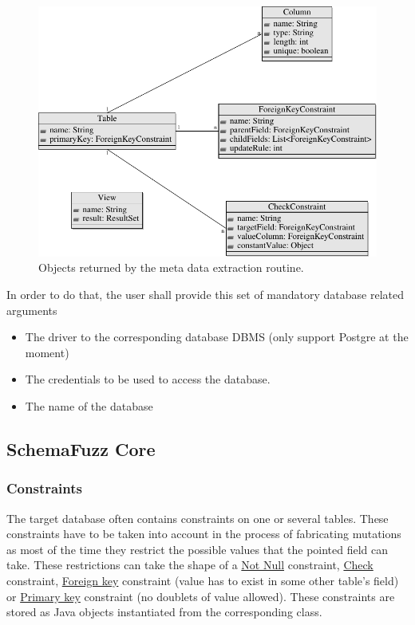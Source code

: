 \documentclass{article}
\begin{document}
\begin{empfile}
\begin{figure} [h!]
\centering
\includegraphics[width=\textwidth]{MetaDataExtractionDiagram-1.pdf}
\caption{Objects returned by the meta data extraction routine.}
\end{figure}

In order to do that, the user shall provide this set of mandatory database related arguments
			\begin{itemize}
 				\item The driver to the corresponding database DBMS (only support Postgre at the moment)
 				\item The credentials to be used to access the database.
 				\item The name of the database
			\end{itemize}
		\subsection{SchemaFuzz Core}		
			\subsubsection{Constraints}
The target database often contains constraints on one or several tables. These constraints have to be taken into account in the process of fabricating mutations as most of the time they restrict the possible values that the pointed field can take. These restrictions can take the shape of a \underline {Not Null} constraint, \underline{Check} constraint, \underline{Foreign key} constraint (value has to exist in some other table's field) or \underline{Primary key} constraint (no doublets of value allowed). These constraints are stored as Java objects instantiated from the corresponding class.
\bigskip


\end{empfile}
\end{document}
